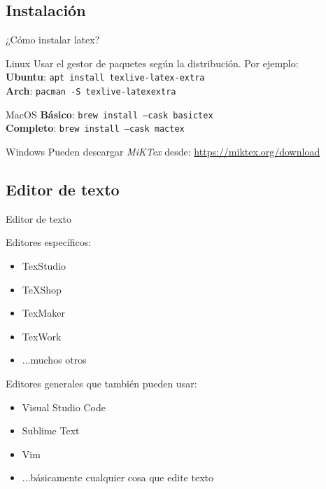 \subsection{Instalación}

\begin{frame}{¿Cómo instalar latex?}

\begin{block}{Linux}
  Usar el gestor de paquetes según la distribución. Por ejemplo:\\[2mm]
  \textbf{Ubuntu}: \texttt{apt install texlive-latex-extra}\\
  \textbf{Arch}: \texttt{pacman -S texlive-latexextra}\\
\end{block}

\pause

\begin{block}{MacOS}
  \textbf{Básico}: \texttt{brew install --cask basictex}\\
  \textbf{Completo}: \texttt{brew install --cask mactex}\\
\end{block}

\pause

\begin{block}{Windows}
  Pueden descargar \emph{MiKTex} desde: \url{https://miktex.org/download}
\end{block}
\end{frame}

\subsection{Editor de texto}

\begin{frame}{Editor de texto}

Editores específicos:

\begin{itemize}
  \item TexStudio
  \item TeXShop
  \item TexMaker
  \item TexWork
  \item ...muchos otros
\end{itemize}

\pause

Editores generales que también pueden usar:

\begin{itemize}
  \item Visual Studio Code
  \item Sublime Text
  \item Vim
  \item ...básicamente cualquier cosa que edite texto
\end{itemize}

\end{frame}

